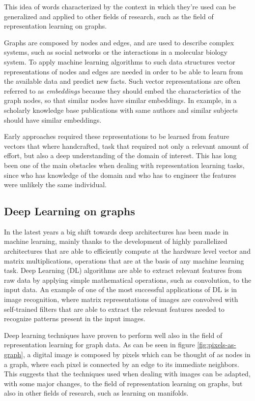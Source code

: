 \documentclass[%
    corpo=13.5pt,
    twoside,
    oldstyle,
    tipotesi=magistrale,
    greek,
    evenboxes
]{toptesi}
\begin{document}
This idea of words characterized by the context in which they're used
can be generalized and applied to other fields of research, such as
the field of representation learning on graphs.

Graphs are composed by nodes and edges, and are used to describe complex
systems, such as social networks or the interactions in a molecular biology
system. To apply machine learning algorithms to such data structures
vector representations of nodes and edges are needed in order
to be able to learn from the available data and predict new facts.
Such vector representations are often referred to as \emph{embeddings} because
they should embed the characteristics of the graph nodes, so that similar nodes
have similar embeddings. In example, in a scholarly knowledge base publications
with same authors and similar subjects should have similar embeddings.

Early approaches required these representations to be learned from feature
vectors that where handcrafted, task that required not
only a relevant amount of effort, but also a deep understanding of the domain
of interest. This has long been one of the main obstacles when dealing with
representation learning tasks, since who has knowledge of the domain and who
has to engineer the features were unlikely the same individual.


\subsection{Deep Learning on graphs}

In the latest years a big shift towards deep architectures has been made
in machine learning, mainly thanks to the development of highly
parallelized architectures that are able to efficiently compute
at the hardware level vector and matrix multiplications, operations that
are at the basis of any machine learning task.
Deep Learning (DL) algorithms are able to extract relevant features from
raw data by applying simple mathematical operations, such as convolution, to
the input data.
An example of one of the most successful applications of DL is in
image recognition, where matrix representations of images are
convolved with self-trained filters that are able to
extract the relevant features needed to recognize patterns present
in the input images.

Deep learning techniques have proven to perform well also in the field of
representation learning for graph data.
As can be seen in figure \ref{fig:pixels-as-graph}, a digital image
is composed by pixels which can be thought of as nodes in a graph, where
each pixel is connected by an edge to its immediate neighbors. This suggests
that the techniques used when dealing with images can be adapted, with
some major changes, to the field of representation learning on graphs, but
also in other fields of research, such as learning on manifolds.
\end{document}
